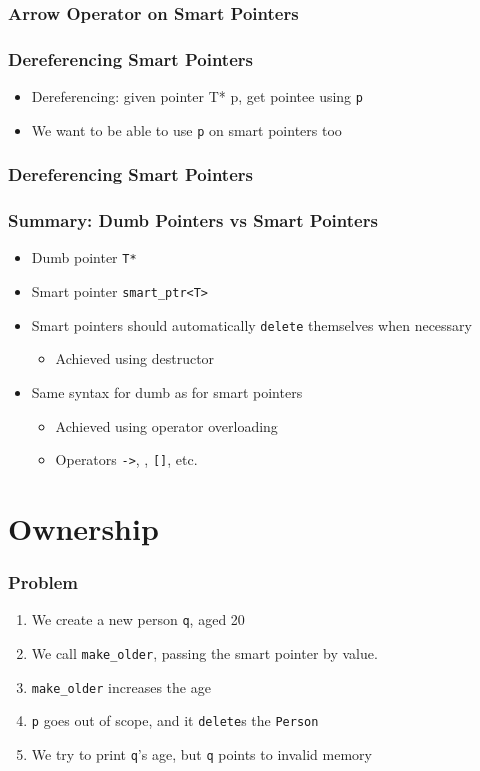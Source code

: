 \begin{frame}
  \frametitle{Arrow Operator on Smart Pointers}
\end{frame}

\begin{frame}
  \frametitle{Dereferencing Smart Pointers}
  \begin{itemize}
    \item Dereferencing: given pointer {T* p}, get pointee using {\tt *p}
    \item We want to be able to use {\tt *p} on smart pointers too
  \end{itemize}
\end{frame}

\begin{frame}
  \frametitle{Dereferencing Smart Pointers}
\end{frame}

\begin{frame}
  \frametitle{Summary: Dumb Pointers vs Smart Pointers}
  \begin{itemize}
    \item Dumb pointer {\tt T*}
    \item Smart pointer {\tt smart\_ptr<T>}
    \item Smart pointers should automatically {\tt delete} themselves when necessary
          \begin{itemize}
            \item Achieved using destructor
          \end{itemize}
    \item Same syntax for dumb as for smart pointers
          \begin{itemize}
            \item Achieved using operator overloading
            \item Operators {\tt ->}, {\tt *}, {\tt []}, etc.
          \end{itemize}
  \end{itemize}
\end{frame}

\section{Ownership}
\frame{\tableofcontents[currentsection]}

\begin{frame}
  \frametitle{Problem}
  \begin{enumerate}
    \item We create a new person {\tt q}, aged 20
    \item We call {\tt make\_older}, passing the smart pointer by value.
    \item {\tt make\_older} increases the age
    \item {\tt p} goes out of scope, and it {\tt delete}s the {\tt Person}
    \item We try to print {\tt q}'s age, but {\tt q} points to invalid memory
  \end{enumerate}
\end{frame}


